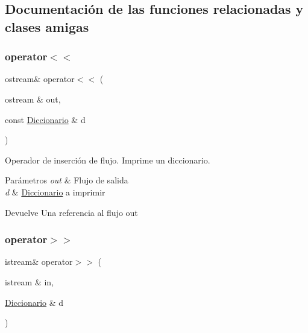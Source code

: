 \subsection{Documentación de las funciones relacionadas y clases amigas}
\mbox{\label{classDiccionario_aeb8c0d19c5f4c9d9680ab42b51dbb38e}} 
\subsubsection{\texorpdfstring{operator$<$$<$}{operator<<}}
{\footnotesize\ttfamily ostream\& operator$<$$<$ (\begin{DoxyParamCaption}\item[{ostream \&}]{out,  }\item[{const \hyperlink{classDiccionario}{Diccionario} \&}]{d }\end{DoxyParamCaption})\hspace{0.3cm}{\ttfamily [friend]}}



Operador de inserción de flujo. Imprime un diccionario. 


\begin{DoxyParams}{Parámetros}
{\em out} & Flujo de salida \\
\hline
{\em d} & \hyperlink{classDiccionario}{Diccionario} a imprimir \\
\hline
\end{DoxyParams}
\begin{DoxyReturn}{Devuelve}
Una referencia al flujo out 
\end{DoxyReturn}
\mbox{\label{classDiccionario_acf72932a86e98d33aef771dde204a44d}} 
\subsubsection{\texorpdfstring{operator$>$$>$}{operator>>}}
{\footnotesize\ttfamily istream\& operator$>$$>$ (\begin{DoxyParamCaption}\item[{istream \&}]{in,  }\item[{\hyperlink{classDiccionario}{Diccionario} \&}]{d }\end{DoxyParamCaption})\hspace{0.3cm}{\ttfamily [friend]}}



